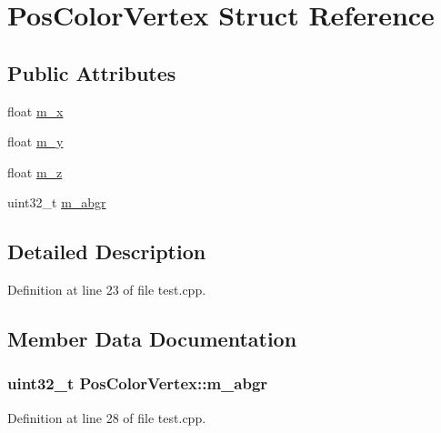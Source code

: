 \hypertarget{struct_pos_color_vertex}{}\section{Pos\+Color\+Vertex Struct Reference}
\label{struct_pos_color_vertex}
\subsection*{Public Attributes}
\begin{DoxyCompactItemize}
\item 
float \hyperlink{struct_pos_color_vertex_ae76dd65e99bcbd4fd79ec0e2c3d0e7af}{m\+\_\+x}
\item 
float \hyperlink{struct_pos_color_vertex_ad7267f34b67c4df4d93f36cfa155ad30}{m\+\_\+y}
\item 
float \hyperlink{struct_pos_color_vertex_ad1c60f507ba3000e2462ac991239bfa9}{m\+\_\+z}
\item 
uint32\+\_\+t \hyperlink{struct_pos_color_vertex_a25470b2d054e5487d952621d4d56df71}{m\+\_\+abgr}
\end{DoxyCompactItemize}


\subsection{Detailed Description}


Definition at line 23 of file test.\+cpp.



\subsection{Member Data Documentation}
\hypertarget{struct_pos_color_vertex_a25470b2d054e5487d952621d4d56df71}{}
\subsubsection[{m\+\_\+abgr}]{\setlength{\rightskip}{0pt plus 5cm}uint32\+\_\+t Pos\+Color\+Vertex\+::m\+\_\+abgr}\label{struct_pos_color_vertex_a25470b2d054e5487d952621d4d56df71}


Definition at line 28 of file test.\+cpp.

\hypertarget{struct_pos_color_vertex_ae76dd65e99bcbd4fd79ec0e2c3d0e7af}{}
